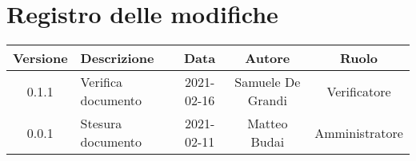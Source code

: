 \section*{Registro delle modifiche}

\begin{center}
	\begin{longtable}{|c|p{5cm}|c|c|c|}
	\hline
	\rowcolor{lighter-grayer}
	\textbf{Versione} & \textbf{Descrizione} & \textbf{Data} & \textbf{Autore} & \textbf{Ruolo} \\
	\hline
	\endfirsthead


	\hline
	0.1.1 & Verifica documento & 2021-02-16 & Samuele De Grandi & Verificatore \\
	\hline
	0.0.1 & Stesura documento & 2021-02-11 & Matteo Budai & Amministratore \\
	\hline
	\end{longtable}
\end{center}